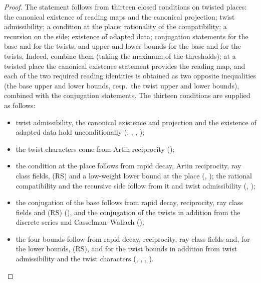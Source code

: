 \begin{proof}
The statement follows from thirteen closed conditions on twisted places: the canonical existence of reading maps
and the canonical projection; twist admissibility; a condition at the place; rationality of the compatibility; a
recursion on the side; existence of adapted data; conjugation statements for the base and for the twists; and upper
and lower bounds for the base and for the twists. Indeed, combine them (taking the maximum of the thresholds); at a
twisted place the canonical existence statement provides the reading map, and each of the two required reading
identities is obtained as two opposite inequalities (the base upper and lower bounds, resp.\ the twist upper and
lower bounds), combined with the conjugation statements. The thirteen conditions are supplied as follows:
\begin{itemize}
\item twist admissibility, the canonical existence and projection and the existence of adapted data hold
unconditionally (, ,
, );
\item the twist characters come from Artin reciprocity ();
\item the condition at the place follows from rapid decay, Artin reciprocity, ray class fields, (RS) and a
low-weight lower bound at the place (,
); the rational compatibility and the recursive side follow from it and twist
admissibility (, );
\item the conjugation of the base follows from rapid decay, reciprocity, ray class fields and (RS)
(), and the conjugation of the twists in
addition from the discrete series and Casselman--Wallach
();
\item the four bounds follow from rapid decay, reciprocity, ray class fields and, for the lower bounds, (RS), and
for the twist bounds in addition from twist admissibility and the twist characters
(,
,
, ).\qedhere
\end{itemize}
\end{proof}

